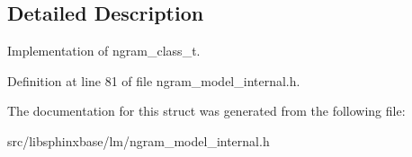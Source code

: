 \subsection{Detailed Description}
Implementation of ngram\-\_\-class\-\_\-t. 

Definition at line 81 of file ngram\-\_\-model\-\_\-internal.\-h.



The documentation for this struct was generated from the following file\-:\begin{DoxyCompactItemize}
\item 
src/libsphinxbase/lm/ngram\-\_\-model\-\_\-internal.\-h\end{DoxyCompactItemize}
